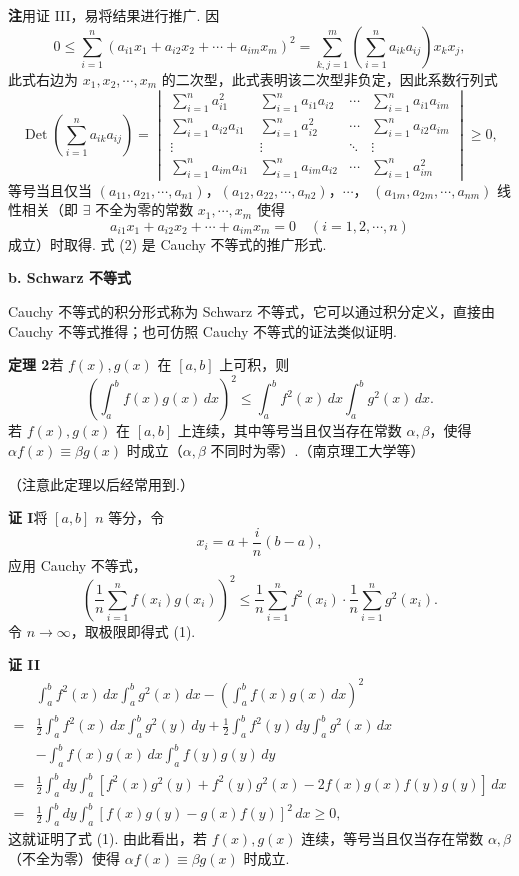 \documentclass[UTF8, 12pt, fontset=fandol, oneside]{ctexart}
\begin{document}
\noindent\textbf{注}\quad 用证 III，易将结果进行推广. 因
\[
0\le\sum_{i=1}^n(a_{i1}x_1+a_{i2}x_2+\cdots+a_{im}x_m)^2
=\sum_{k,j=1}^m\left(\sum_{i=1}^n a_{ik}a_{ij}\right)x_kx_j,
\]
此式右边为 $x_1,x_2,\cdots,x_m$ 的二次型，此式表明该二次型非负定，因此系数行列式
\[
\operatorname{Det}\left(\sum_{i=1}^n a_{ik}a_{ij}\right)
=
\begin{vmatrix}
\sum_{i=1}^n a_{i1}^2&\sum_{i=1}^n a_{i1}a_{i2}&\cdots&\sum_{i=1}^n a_{i1}a_{im}\\
\sum_{i=1}^n a_{i2}a_{i1}&\sum_{i=1}^n a_{i2}^2&\cdots&\sum_{i=1}^n a_{i2}a_{im}\\
\vdots&\vdots&\ddots&\vdots\\
\sum_{i=1}^n a_{im}a_{i1}&\sum_{i=1}^n a_{im}a_{i2}&\cdots&\sum_{i=1}^n a_{im}^2
\end{vmatrix}\ge0, \tag{2}
\]
等号当且仅当 $(a_{11},a_{21},\cdots,a_{n1})$，$(a_{12},a_{22},\cdots,a_{n2})$，$\cdots$，
$(a_{1m},a_{2m},\cdots,a_{nm})$ 线性相关（即 $\exists$ 不全为零的常数 $x_1,\cdots,x_m$ 使得
\[
a_{i1}x_1+a_{i2}x_2+\cdots+a_{im}x_m=0\quad(i=1,2,\cdots,n)
\]
成立）时取得. 式 (2) 是 Cauchy 不等式的推广形式.

\noindent\textbf{b. Schwarz 不等式}

Cauchy 不等式的积分形式称为 Schwarz 不等式，它可以通过积分定义，直接由 Cauchy 不等式推得；也可仿照 Cauchy 不等式的证法类似证明.

\noindent\textbf{定理 2}\quad 若 $f(x),g(x)$ 在 $[a,b]$ 上可积，则
\[
\left(\int_a^b f(x)g(x)\,dx\right)^2
\le \int_a^b f^2(x)\,dx\int_a^b g^2(x)\,dx. \tag{1}
\]
若 $f(x),g(x)$ 在 $[a,b]$ 上连续，其中等号当且仅当存在常数 $\alpha,\beta$，使得
$\alpha f(x)\equiv\beta g(x)$ 时成立（$\alpha,\beta$ 不同时为零）.（南京理工大学等）

（注意此定理以后经常用到.）

\noindent\textbf{证 I}\quad 将 $[a,b]$ $n$ 等分，令
\[
x_i=a+\frac in(b-a),
\]
应用 Cauchy 不等式，
\[
\left(\frac1n\sum_{i=1}^n f(x_i)g(x_i)\right)^2
\le \frac1n\sum_{i=1}^n f^2(x_i)\cdot \frac1n\sum_{i=1}^n g^2(x_i).
\]
令 $n\to\infty$，取极限即得式 (1).

\noindent\textbf{证 II}\quad
\[
\begin{aligned}
&\int_a^b f^2(x)\,dx\int_a^b g^2(x)\,dx
-\left(\int_a^b f(x)g(x)\,dx\right)^2\\
={}&\frac12\int_a^b f^2(x)\,dx\int_a^b g^2(y)\,dy
+\frac12\int_a^b f^2(y)\,dy\int_a^b g^2(x)\,dx\\
&-\int_a^b f(x)g(x)\,dx\int_a^b f(y)g(y)\,dy\\
={}&\frac12\int_a^b dy\int_a^b
[f^2(x)g^2(y)+f^2(y)g^2(x)-2f(x)g(x)f(y)g(y)]\,dx\\
={}&\frac12\int_a^b dy\int_a^b[f(x)g(y)-g(x)f(y)]^2\,dx\ge0,
\end{aligned}
\]
这就证明了式 (1). 由此看出，若 $f(x),g(x)$ 连续，等号当且仅当存在常数 $\alpha,\beta$（不全为零）使得
$\alpha f(x)\equiv\beta g(x)$ 时成立.
\end{document}
